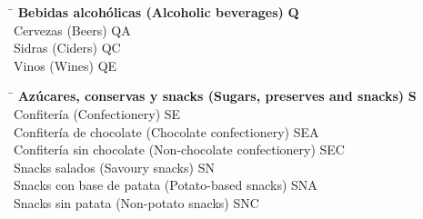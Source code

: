 \begin{small}
    \begin{tabbing}
    \hspace{15cm} \= \hspace{0cm} \kill
        \textbf{Bebidas alcohólicas (Alcoholic beverages)} \> \textbf{Q} \\
            \hspace{0.5cm}Cervezas (Beers) \> QA \\
            \hspace{0.5cm}Sidras (Ciders) \> QC \\
            \hspace{0.5cm}Vinos (Wines) \> QE \\
    \end{tabbing}

    \vspace{-1.25cm}
    
    \begin{tabbing}
    \hspace{15cm} \= \hspace{0cm} \kill
        \textbf{Azúcares, conservas y snacks (Sugars, preserves and snacks)} \> \textbf{S} \\
            \hspace{0.5cm}Confitería (Confectionery) \> SE \\
                \hspace{1cm}Confitería de chocolate (Chocolate confectionery) \> SEA \\
                \hspace{1cm}Confitería sin chocolate (Non-chocolate confectionery) \> SEC \\
            \hspace{0.5cm}Snacks salados (Savoury snacks) \> SN \\
                \hspace{1cm}Snacks con base de patata (Potato-based snacks) \> SNA \\
                \hspace{1cm}Snacks sin patata (Non-potato snacks) \> SNC \\
    \end{tabbing}

    \vspace{-1.25cm}
    

\end{small}
